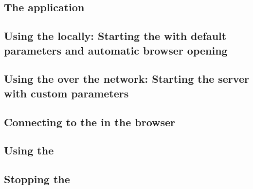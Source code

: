 \subsection{The \dash{} application}


\subsection{Using the \dash{} locally: Starting the \dash{} with default parameters and automatic browser opening}
\label{TasksDashDefault}


\subsection{Using the \dash{} over the network{}: Starting the \dash{} server with custom parameters}
\label{TasksDashCustom}


\subsection{Connecting to the \dash{} in the browser}
\label{TasksDashConnect}


\subsection{Using the \dash{}}
\label{TasksDashUse}


\subsection{Stopping the \dash{}}
\label{TasksDashStop}

